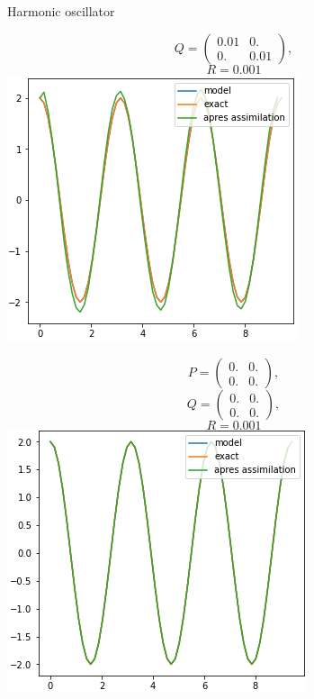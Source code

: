 \begin{frame}{Harmonic oscillator}
\begin{minipage}{.32\linewidth}
           $$Q=\begin{pmatrix}
               0.01 & 0. \\
               0. & 0.01 
           \end{pmatrix} ,$$
           $$R=0.001$$
           \includegraphics[width=\linewidth]{"images/enkf/oscillator2_b.png"}
       \end{minipage} \;
       \begin{minipage}{.32\linewidth}
           \centering
           $$P=\begin{pmatrix}
               0. & 0. \\
               0. & 0. 
           \end{pmatrix} ,$$
           $$Q=\begin{pmatrix}
               0. & 0. \\
               0. & 0. 
           \end{pmatrix} ,$$
           $$R=0.001$$
           \includegraphics[width=\linewidth]{"images/enkf/oscillator3_b.png"}

\end{minipage}
\end{frame}
